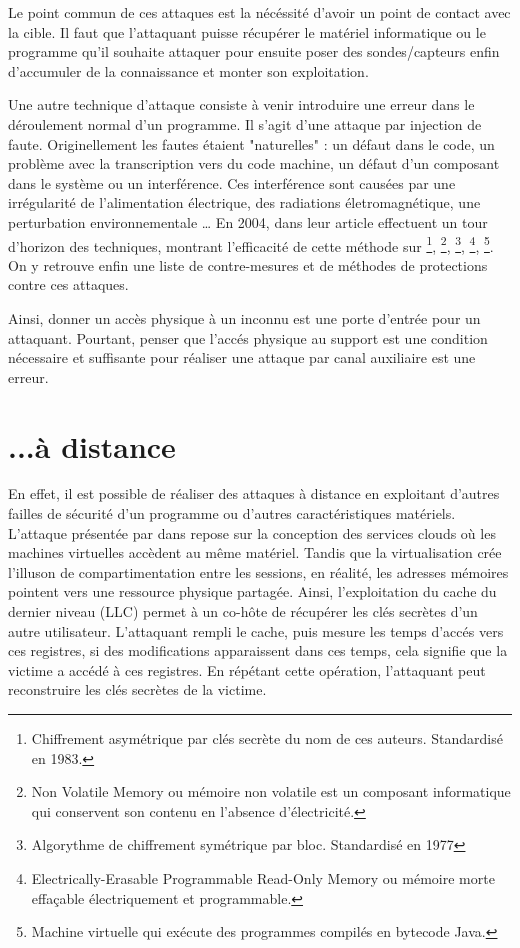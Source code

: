 Le point commun de ces attaques est la nécéssité d'avoir un point de contact avec la cible. Il faut que l'attaquant puisse récupérer le matériel informatique ou le programme qu'il souhaite attaquer pour ensuite poser des sondes/capteurs enfin d'accumuler de la connaissance et monter son exploitation.\bigbreak


Une autre technique d'attaque consiste à venir introduire une erreur dans le déroulement normal d'un programme. Il s'agit d'une attaque par injection de faute. Originellement \cite{faultOverview} les fautes étaient "naturelles" : un défaut dans le code, un problème avec la transcription vers du code machine, un défaut d'un composant dans le système ou un interférence. Ces interférence sont causées par une irrégularité de l'alimentation électrique, des radiations életromagnétique, une perturbation environnementale \etc\dots
En 2004, \citeauthor{Fault_Attacks} dans leur article  \cite{Fault_Attacks} effectuent un tour d'horizon des techniques, montrant l'efficacité de cette méthode sur \footnote{Chiffrement asymétrique par clés secrète du nom de ces auteurs. Standardisé en 1983.}, \footnote{Non Volatile Memory ou mémoire non volatile est un composant informatique qui conservent son contenu en l'absence d'électricité.}, \footnote{Algorythme de chiffrement symétrique par bloc. Standardisé en 1977}, \footnote{Electrically-Erasable Programmable Read-Only Memory ou mémoire morte effaçable électriquement et programmable.}, \footnote{Machine virtuelle qui exécute des programmes compilés en bytecode Java.}. On y retrouve enfin une liste de contre-mesures et de méthodes de protections contre ces attaques.\medbreak

Ainsi, donner un accès physique à un inconnu est une porte d'entrée pour un attaquant. Pourtant, penser que l'accés physique au support est une condition nécessaire et suffisante pour réaliser une attaque par canal auxiliaire est une erreur.

\section{...à distance}

En effet, il est possible de réaliser des attaques à distance en exploitant d'autres failles de sécurité d'un programme ou d'autres caractéristiques matériels. L'attaque présentée par \citeauthor{LLC_attack} dans  \cite{LLC_attack} repose sur la conception des services clouds où les machines virtuelles accèdent au même matériel. Tandis que la virtualisation crée l'illuson de compartimentation entre les sessions, en réalité, les adresses mémoires pointent vers une ressource physique partagée. Ainsi, l'exploitation du cache du dernier niveau (LLC) permet à un co-hôte de récupérer les clés secrètes d'un autre utilisateur. L'attaquant rempli le cache, puis mesure les temps d'accés vers ces registres, si des modifications apparaissent dans ces temps, cela signifie que la victime a accédé à ces registres. En répétant cette opération, l'attaquant peut reconstruire les clés secrètes de la victime.\medbreak


